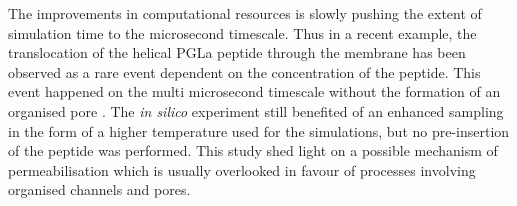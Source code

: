 
The improvements in computational resources is slowly pushing the extent of simulation time to the microsecond timescale.
%
Thus in a recent example, the translocation of the helical PGLa peptide through the membrane has been observed as a rare event dependent on the concentration of the peptide. This event happened on the multi microsecond timescale without the formation of an organised pore \citep{Ulmschneider2017}. The \emph{in silico} experiment still benefited of an enhanced sampling in the form of a higher temperature used for the simulations, but no pre-insertion of the peptide was performed. This study shed light on a possible mechanism of permeabilisation which is usually overlooked in favour of processes involving organised channels and pores. %

